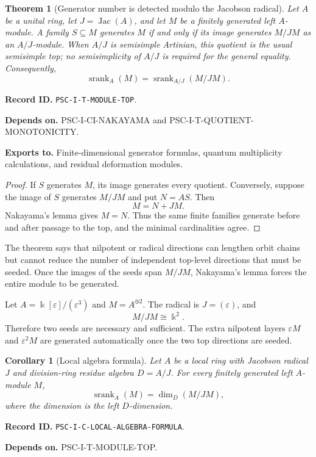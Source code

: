 \documentclass[11pt]{article}
\newtheorem{theorem}{Theorem}[section]
\newtheorem{corollary}[corollary]{Corollary}
\theoremstyle{definition}
\theoremstyle{remark}
\newcommand{\bbk}{\Bbbk}
\newcommand{\srank}{\operatorname{srank}}
\newcommand{\Jac}{\operatorname{Jac}}
\newcommand{\RecordID}[1]{\par\smallskip\noindent\begingroup\footnotesize\color{PSCGray}\raggedright\textbf{Record ID.} \nolinkurl{#1}.\par\endgroup}
\newcommand{\Depends}[1]{\par\noindent\begingroup\footnotesize\color{PSCGray}\raggedright\textbf{Depends on.} #1\par\endgroup}
\newcommand{\Exports}[1]{\par\noindent\begingroup\footnotesize\color{PSCGray}\raggedright\textbf{Exports to.} #1\par\endgroup}
\begin{document}
\begin{theorem}[Generator number is detected modulo the Jacobson radical]
\label{thm:module-top}
Let $A$ be a unital ring, let $J=\Jac(A)$, and let $M$ be a finitely generated left $A$-module.  A family $S\subseteq M$ generates $M$ if and only if its image generates $M/JM$ as an $A/J$-module.  When $A/J$ is semisimple Artinian, this quotient is the usual semisimple top; no semisimplicity of $A/J$ is required for the general equality.  Consequently,
\[
\boxed{
\srank_A(M)=\srank_{A/J}(M/JM).
}
\]
\end{theorem}
\RecordID{PSC-I-T-MODULE-TOP}
\Depends{PSC-I-CI-NAKAYAMA and PSC-I-T-QUOTIENT-MONOTONICITY.}
\Exports{Finite-dimensional generator formulas, quantum multiplicity calculations, and residual deformation modules.}

\begin{proof}
If $S$ generates $M$, its image generates every quotient.  Conversely, suppose the image of $S$ generates $M/JM$ and put $N=AS$.  Then
\[
M=N+JM.
\]
Nakayama's lemma gives $M=N$.  Thus the same finite families generate before and after passage to the top, and the minimal cardinalities agree.
\end{proof}

\begin{interpretation}
The theorem says that nilpotent or radical directions can lengthen orbit chains but cannot reduce the number of independent top-level directions that must be seeded.  Once the images of the seeds span \(M/JM\), Nakayama's lemma forces the entire module to be generated.
\end{interpretation}

\begin{microexample}[title={A local nilpotent algebra}]
Let \(A=\bbk[\varepsilon]/(\varepsilon^3)\) and \(M=A^{\oplus2}\).  The radical is \(J=(\varepsilon)\), and
\[
M/JM\cong\bbk^2.
\]
Therefore two seeds are necessary and sufficient.  The extra nilpotent layers \(\varepsilon M\) and \(\varepsilon^2M\) are generated automatically once the two top directions are seeded.
\end{microexample}


\begin{corollary}[Local algebra formula]
\label{cor:local-algebra-formula}
Let $A$ be a local ring with Jacobson radical $J$ and division-ring residue algebra $D=A/J$.  For every finitely generated left $A$-module $M$,
\[
\boxed{
\srank_A(M)=\dim_D(M/JM),
}
\]
where the dimension is the left $D$-dimension.
\end{corollary}
\RecordID{PSC-I-C-LOCAL-ALGEBRA-FORMULA}
\Depends{PSC-I-T-MODULE-TOP.}
\end{document}
